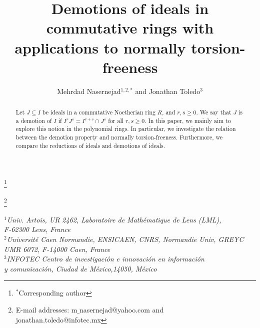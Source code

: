 \documentclass[11pt]{amsart}
\begin{document}
\author[M. Nasernejad  and   J. Toledo]{Mehrdad  Nasernejad$^{1,2,*}$  and   Jonathan Toledo$^{3}$}
\title[Demotions of ideals in commutative rings]{Demotions of ideals in commutative rings with applications to normally torsion-freeness}



\thanks{$^*$Corresponding author}




\thanks{E-mail addresses:  m$\_$nasernejad@yahoo.com  and  jonathan.toledo@infotec.mx}  
\maketitle

\begin{center}
{\it
$^{1}$Univ. Artois, UR 2462, Laboratoire de Math\'{e}matique de  Lens (LML), \\  F-62300 Lens, France \\ 
$^{2}$Universit\'e  Caen Normandie, ENSICAEN, CNRS, Normandie Univ, GREYC UMR  6072, F-14000 Caen,  France\\
$^{3}$INFOTEC Centro de investigaci\'{o}n e innovaci\'{o}n en informaci\'{o}n \\
 y comunicaci\'{o}n, Ciudad de M\'{e}xico,14050, M\'{e}xico
}
\end{center}




\maketitle



\begin{abstract}
Let  $J \subseteq  I$ be ideals in a commutative Noetherian ring $R$, and $r,s\geq 0$. We say that  $J$ is  a  demotion of $I$ if
$I^rJ^s=I^{r+s}\cap J^s$ for all $r,s\geq 0$. In this paper, we mainly aim to explore this notion in the  polynomial rings. In particular, we investigate 
the relation between the demotion property and normally torsion-freeness. Furthermore, we compare the reductions of ideals and demotions of ideals.
\end{abstract}
\vspace{0.4cm}


\end{document}
